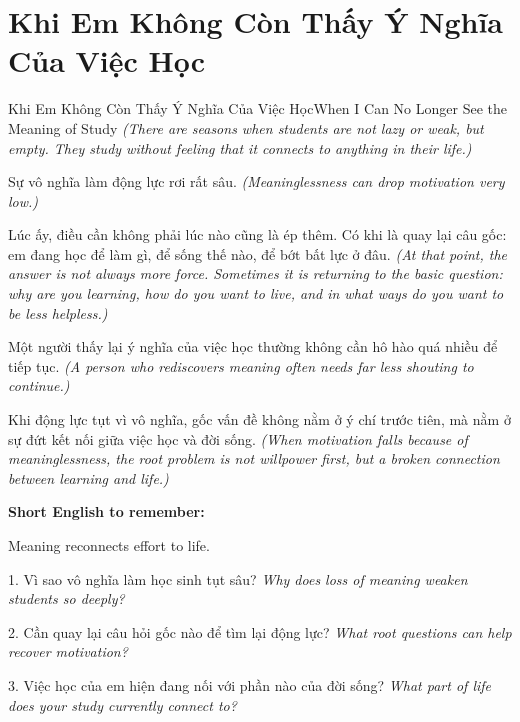 \section{Khi Em Không Còn Thấy Ý Nghĩa Của Việc Học}
\begin{truyen}{Khi Em Không Còn Thấy Ý Nghĩa Của Việc Học}{When I Can No Longer See the Meaning of Study}
\textit{(There are seasons when students are not lazy or weak, but empty. They study without feeling that it connects to anything in their life.)}

Sự vô nghĩa làm động lực rơi rất sâu.
\textit{(Meaninglessness can drop motivation very low.)}

Lúc ấy, điều cần không phải lúc nào cũng là ép thêm. Có khi là quay lại câu gốc: em đang học để làm gì, để sống thế nào, để bớt bất lực ở đâu.
\textit{(At that point, the answer is not always more force. Sometimes it is returning to the basic question: why are you learning, how do you want to live, and in what ways do you want to be less helpless.)}

Một người thấy lại ý nghĩa của việc học thường không cần hô hào quá nhiều để tiếp tục.
\textit{(A person who rediscovers meaning often needs far less shouting to continue.)}
\end{truyen}

\begin{baihoc}
Khi động lực tụt vì vô nghĩa, gốc vấn đề không nằm ở ý chí trước tiên, mà nằm ở sự đứt kết nối giữa việc học và đời sống.
\textit{(When motivation falls because of meaninglessness, the root problem is not willpower first, but a broken connection between learning and life.)}
\end{baihoc}

\begin{ghinhoanh}
\textbf{Short English to remember:}

Meaning reconnects effort to life.

\end{ghinhoanh}

\begin{tuhocnhanh}
1. Vì sao vô nghĩa làm học sinh tụt sâu? \textit{Why does loss of meaning weaken students so deeply?}

2. Cần quay lại câu hỏi gốc nào để tìm lại động lực? \textit{What root questions can help recover motivation?}

3. Việc học của em hiện đang nối với phần nào của đời sống? \textit{What part of life does your study currently connect to?}
\end{tuhocnhanh}
\ngancach

